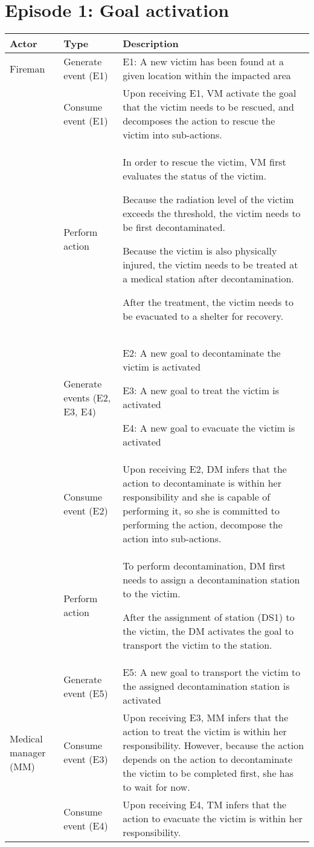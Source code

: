
\section{Episode 1: Goal activation} %
\label{sec:episode_1_goal_activation}
\footnotesize
{
	\begin{longtable}{>{\raggedright}p{1.2in}>{\raggedright}p{1.2in}>{\raggedright}p{3in}}
\toprule 
\textbf{Actor} & \textbf{Type} & \textbf{Description}\tabularnewline
\midrule 
Fireman & Generate event (E1) & E1: A new victim has been found at a given location within the impacted
area\tabularnewline
\midrule 
\multirow{3}{1.2in}{Victim manager (VM)} & Consume event (E1) & Upon receiving E1, VM activate the goal that the victim needs to be
rescued, and decomposes the action to rescue the victim into sub-actions.\tabularnewline
\cmidrule{2-3} 
 & Perform action & In order to rescue the victim, VM first evaluates the status of the
victim. 

Because the radiation level of the victim exceeds the threshold, the
victim needs to be first decontaminated.

Because the victim is also physically injured, the victim needs to
be treated at a medical station after decontamination.

After the treatment, the victim needs to be evacuated to a shelter
for recovery.\tabularnewline
\cmidrule{2-3} 
 & Generate events (E2, E3, E4) & E2: A new goal to decontaminate the victim is activated

E3: A new goal to treat the victim is activated

E4: A new goal to evacuate the victim is activated\tabularnewline
\midrule 
\multirow{3}{1.2in}{Decontamination manager (DM)} & Consume event (E2) & Upon receiving E2, DM infers that the action to decontaminate is within
her responsibility and she is capable of performing it, so she is
committed to performing the action, decompose the action into sub-actions.\tabularnewline
\cmidrule{2-3} 
 & Perform action & To perform decontamination, DM first needs to assign a decontamination
station to the victim.

After the assignment of station (DS1) to the victim, the DM activates
the goal to transport the victim to the station. \tabularnewline
\cmidrule{2-3} 
 & Generate event (E5) & E5: A new goal to transport the victim to the assigned decontamination
station is activated\tabularnewline
\midrule 
Medical manager (MM) & Consume event (E3) & Upon receiving E3, MM infers that the action to treat the victim is
within her responsibility. However, because the action depends on
the action to decontaminate the victim to be completed first, she
has to wait for now.\tabularnewline
\midrule 
\multirow{4}{1.2in}{Transportation manager (TM)} & Consume event (E4) & Upon receiving E4, TM infers that the action to evacuate the victim
is within her responsibility.


\end{longtable}}
